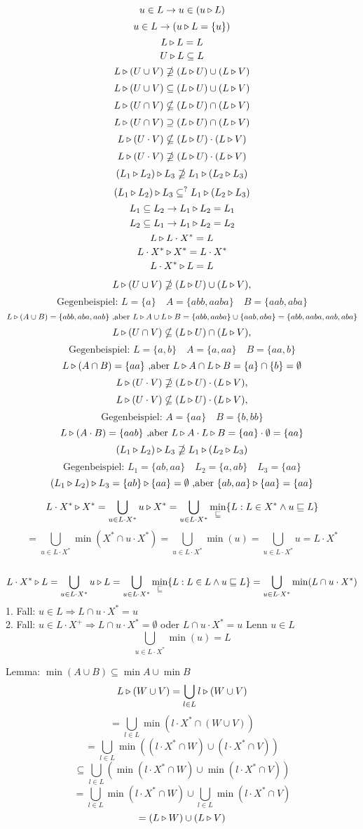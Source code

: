 $$u\in L \to u\in (u\triangleright L)$$
$$u\in L \to (u\triangleright L=\{u\})$$
$$L\triangleright L = L$$
$$U\triangleright L \subseteq L$$
$$L\triangleright (U\cup V)\nsupseteq (L\triangleright U) \cup (L\triangleright V)$$
$$L\triangleright (U\cup V)\subseteq (L\triangleright U) \cup (L\triangleright V)$$
$$L\triangleright (U\cap V)\nsubseteq (L\triangleright U) \cap (L\triangleright V)$$
$$L\triangleright (U\cap V)\supseteq (L\triangleright U) \cap (L\triangleright V)$$
$$L\triangleright (U\cdot V)\nsubseteq (L\triangleright U) \cdot (L\triangleright V)$$
$$L\triangleright (U\cdot V)\nsupseteq (L\triangleright U) \cdot (L\triangleright V)$$
$$(L_1 \triangleright L_2) \triangleright L_3 \nsupseteq L_1 \triangleright (L_2 \triangleright L_3)$$
$$(L_1 \triangleright L_2) \triangleright L_3 \subseteq^? L_1 \triangleright (L_2 \triangleright L_3)$$
$$L_1\subseteq L_2 \to L_1\triangleright L_2 = L_1$$
$$L_2\subseteq L_1 \to L_1\triangleright L_2 = L_2$$
$$L\triangleright L\cdot X^* = L$$
$$L\cdot X^*\triangleright X^* = L\cdot X^*$$
$$L\cdot X^*\triangleright L = L$$

\newpage
$$L\triangleright (U\cup V) \nsupseteq (L\triangleright U) \cup (L\triangleright V),$$
$$\text{Gegenbeispiel: } L=\{a\}\quad A=\{abb,aaba\}\quad B=\{aab,aba\} $$
$$L\triangleright (A\cup B) = \{abb,aba,aab\}\text{ ,aber } L\triangleright A \cup L\triangleright B =
\{abb,aaba\} \cup \{aab,aba\} = \{abb,aaba,aab,aba\} $$
\vspace{5mm}
$$L\triangleright (U\cap V)\nsubseteq (L\triangleright U) \cap (L\triangleright V),$$
$$\text{Gegenbeispiel: } L=\{a,b\}\quad A=\{a,aa\}\quad B=\{aa,b\} $$
$$L\triangleright (A\cap B) = \{aa\}\text{ ,aber } L\triangleright A \cap L\triangleright B =
\{a\} \cap \{b\} = \emptyset $$
\vspace{5mm}
$$L\triangleright (U\cdot V)\nsupseteq (L\triangleright U) \cdot (L\triangleright V),$$
$$L\triangleright (U\cdot V)\nsubseteq (L\triangleright U) \cdot (L\triangleright V),$$
$$\text{Gegenbeispiel: } A=\{aa\}\quad B=\{b,bb\} $$
$$L\triangleright (A\cdot B) = \{aab\}\text{ ,aber } L\triangleright A \cdot L\triangleright B =
\{aa\} \cdot \emptyset = \{aa\} $$
\vspace{5mm}
$$(L_1 \triangleright L_2) \triangleright L_3 \nsupseteq L_1 \triangleright (L_2 \triangleright L_3)$$
$$\text{Gegenbeispiel: } L_1=\{ab,aa\}\quad L_2=\{a,ab\}\quad L_3=\{aa\}$$
$$(L_1 \triangleright L_2) \triangleright L_3 = \{ab\} \triangleright \{aa\} = \emptyset\text{ ,aber } 
\{ab,aa\} \triangleright \{aa\} = \{aa\} $$
\vspace{5mm}

$$L\cdot X^* \triangleright X^* = \bigcup_{u\in L\cdot X^*} u\triangleright X^* = \bigcup_{u\in L\cdot X^*} \min_{\sqsubseteq} \{L:L\in X^*\wedge u\sqsubseteq L\}$$ 
$$= \bigcup_{u\in L\cdot X^*} \min(X^* \cap u\cdot X^*)=\bigcup_{u\in L\cdot X^*} \min(u) = \bigcup_{u\in L\cdot X^*} u = L\cdot X^*$$\\

$$L\cdot X^* \triangleright L = \bigcup_{u\in L\cdot X^*} u\triangleright L = \bigcup_{u\in L\cdot X^*} \min_{\sqsubseteq} \{L:L\in L \wedge u\sqsubseteq L\} = \bigcup_{u\in L\cdot X^*} \min(L\cap u\cdot X^*) $$
1. Fall: $u\in L \Rightarrow L\cap u\cdot X^* = u$\\
2. Fall: $u\in  L\cdot X^+ \Rightarrow L\cap u\cdot X^* = \emptyset$ oder $L\cap u\cdot X^* = u$ Lenn $u\in L$\\
$$\bigcup_{u\in L\cdot X^*} \min(u) = L$$


\newpage
Lemma: $\min (A\cup B) \subseteq \min A \cup \min B$
$$L\triangleright (W\cup V)= \bigcup_{l\in L} l\triangleright (W\cup V)$$
$$=\bigcup_{l\in L} \min (l\cdot X^* \cap (W\cup V))$$
$$=\bigcup_{l\in L} \min ((l\cdot X^* \cap W) \cup (l\cdot X^* \cap V))$$
$$\subseteq \bigcup_{l\in L} (\min (l\cdot X^* \cap W) \cup \min (l\cdot X^* \cap V))$$
$$=\bigcup_{l\in L} \min (l\cdot X^*\cap W) \cup \bigcup_{l\in L} \min(l\cdot X^* \cap V)$$
$$=(L\triangleright W)\cup (L\triangleright V)$$